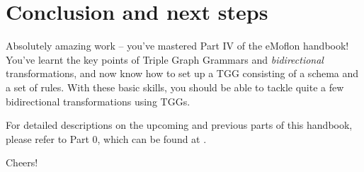 \section{Conclusion and next steps}
\genHeader

\vspace{0.5cm}

Absolutely amazing work -- you've mastered Part IV of the eMoflon handbook! You've learnt the key points of Triple Graph Grammars and \emph{bidirectional} transformations, and now know how to set up a TGG consisting of a schema and a set of rules. 
With these basic skills, you should be able to tackle quite a few bidirectional transformations using TGGs.

For detailed descriptions on the upcoming and previous parts of this handbook, please refer to Part 0, which can be found at \dlPartZero.

Cheers!


